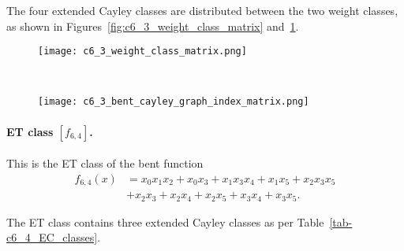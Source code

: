 The four extended Cayley classes are distributed between the two weight classes,
as shown in Figures~\ref{fig:c6_3_weight_class_matrix} and~\ref{fig:c6_3_bent_cayley_graph_index_matrix}.

\begin{figure}[!ht] %
\centering
\begin{minipage}{.48\textwidth}
  \centering
  \texttt{[image: c6\_3\_weight\_class\_matrix.png]}
  \label{fig:c6_3_weight_class_matrix}
\end{minipage}%
~~~~
\begin{minipage}{.48\textwidth}
  \centering
  \texttt{[image: c6\_3\_bent\_cayley\_graph\_index\_matrix.png]}
  \label{fig:c6_3_bent_cayley_graph_index_matrix}
\end{minipage}
\end{figure}

\paragraph*{ET class $[f_{6,4}]$.}
%
This is the ET class of the bent function
\begin{align*}
f_{6,4}(x) &= x_{0} x_{1} x_{2} + x_{0} x_{3} + x_{1} x_{3} x_{4} + x_{1} x_{5} + x_{2} x_{3} x_{5}
\\
           &+ x_{2} x_{3} + x_{2} x_{4} + x_{2} x_{5} + x_{3} x_{4} + x_{3} x_{5}.
\end{align*}

The ET class contains three extended Cayley classes as per Table~\ref{tab-c6_4_EC_classes}.


